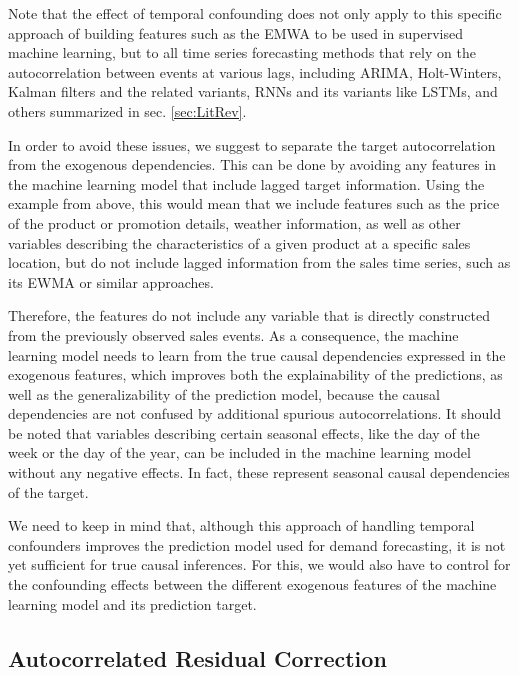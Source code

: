 \documentclass[BCOR=1mm, DIV=calc,10pt,
twoside=true,
twocolumn,
headings=normal]{scrartcl}
\begin{document}
Note that the effect of temporal confounding does not only apply to this specific approach of building features such as the EMWA to be used in supervised machine learning, but to all time series forecasting methods that rely on the autocorrelation between events at various lags, including ARIMA, Holt-Winters, Kalman filters and the related variants, RNNs and its variants like LSTMs, and others summarized in sec. \ref{sec:LitRev}.

In order to avoid these issues, we suggest to separate the target autocorrelation from the exogenous dependencies. This can be done by avoiding any features in the machine learning model that include lagged target information. Using the example from above, this would mean that we include features such as the price of the product or promotion details, weather information, as well as other variables describing the characteristics of a given product at a specific sales location, but do not include lagged information from the sales time series, such as its EWMA or similar approaches.

Therefore, the features do not include any variable that is directly constructed from the previously observed sales events. As a consequence, the machine learning model needs to learn from the true causal dependencies expressed in the exogenous features, which improves both the explainability of the predictions, as well as the generalizability of the prediction model, because the causal dependencies are not confused by additional spurious autocorrelations. It should be noted that variables describing certain seasonal effects, like the day of the week or the day of the year, can be included in the machine learning model without any negative effects. In fact, these represent seasonal causal dependencies of the target.

We need to keep in mind that, although this approach of handling temporal confounders improves the prediction model used for demand forecasting, it is not yet sufficient for true causal inferences. For this, we would also have to control for the confounding effects between the different exogenous features of the machine learning model and its prediction target.

\subsection{Autocorrelated Residual Correction}
\end{document}
